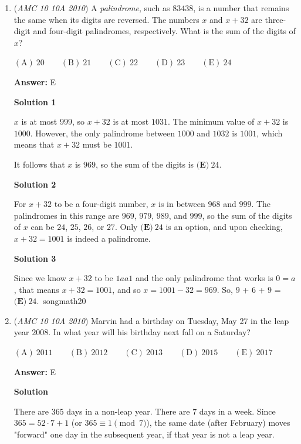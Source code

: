 \begin{enumerate}
	\item (\textit{AMC 10 10A 2010}) A \textit{palindrome}, such as $83438$, is a number that remains the same when its digits are reversed. The numbers $x$ and $x+32$ are three-digit and four-digit palindromes, respectively. What is the sum of the digits of $x$?


 $\mathrm{(A)}\ 20 \qquad \mathrm{(B)}\ 21 \qquad \mathrm{(C)}\ 22 \qquad \mathrm{(D)}\ 23 \qquad \mathrm{(E)}\ 24$

 \textbf{Answer: }E



\textbf{Solution 1}

$x$ is at most $999$, so $x+32$ is at most $1031$. The minimum value of $x+32$ is $1000$. However, the only palindrome between $1000$ and $1032$ is $1001$, which means that $x+32$ must be $1001$.

 It follows that $x$ is $969$, so the sum of the digits is $\boxed{\textbf{(E)}\ 24}$.

 



\textbf{Solution 2}

For $x+32$ to be a four-digit number, $x$ is in between $968$ and $999$. The palindromes in this range are $969$, $979$, $989$, and $999$, so the sum of the digits of $x$ can be $24$, $25$, $26$, or $27$. Only $\boxed{\textbf{(E)}\ 24}$ is an option, and upon checking, $x+32=1001$ is indeed a palindrome.

 



\textbf{Solution 3}

Since we know $x+32$ to be $1 a a 1$ and the only palindrome that works is $0 = a$, that means $x+32 = 1001$, and so $x = 1001 - 32 = 969$. So, $9$ + $6$ + $9$ = $\boxed{\textbf{(E)}\ 24}$.~songmath20

 


	\item (\textit{AMC 10 10A 2010}) Marvin had a birthday on Tuesday, May 27 in the leap year $2008$. In what year will his birthday next fall on a Saturday?


 $\mathrm{(A)}\ 2011 \qquad \mathrm{(B)}\ 2012 \qquad \mathrm{(C)}\ 2013 \qquad \mathrm{(D)}\ 2015 \qquad \mathrm{(E)}\ 2017$

 \textbf{Answer: }E



\textbf{Solution}

There are $365$ days in a non-leap year. There are $7$ days in a week. Since $365 = 52 \cdot 7 + 1$ (or $365\equiv 1 \pmod{ 7}$), the same date (after February) moves "forward" one day in the subsequent year, if that year is not a leap year.


\end{enumerate}
